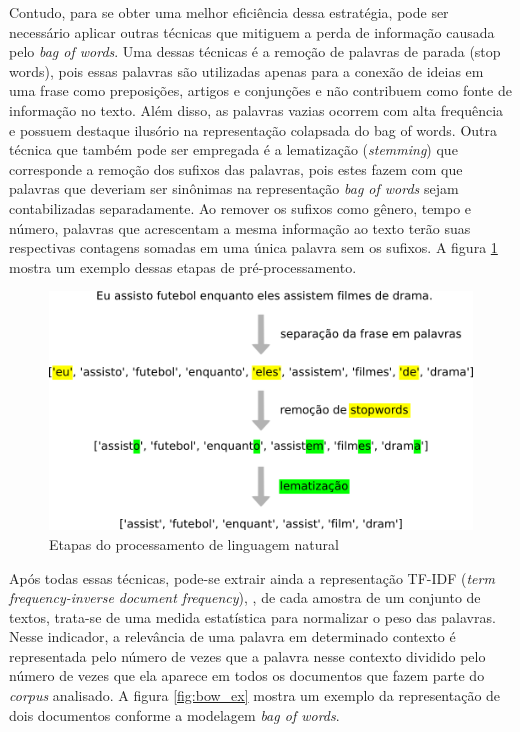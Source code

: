 Contudo, para se obter uma melhor eficiência dessa estratégia, pode ser necessário aplicar outras técnicas que mitiguem a perda de informação causada pelo \textit{bag of words}. Uma dessas técnicas é a remoção de palavras de parada (stop words), pois essas palavras são utilizadas apenas para a conexão de ideias em uma frase como preposições, artigos e conjunções e não contribuem como fonte de informação no texto. Além disso, as palavras vazias ocorrem com alta frequência e possuem destaque ilusório na representação colapsada do bag of words. Outra técnica que também pode ser empregada é a lematização (\textit{stemming}) que corresponde a remoção dos sufixos das palavras, pois estes fazem com que palavras que deveriam ser sinônimas na representação \textit{bag of words} sejam contabilizadas separadamente. Ao remover os sufixos como gênero, tempo e número, palavras que acrescentam a mesma informação ao texto terão suas respectivas contagens somadas em uma única palavra sem os sufixos. A figura \ref{fig:nl_ex} mostra um exemplo dessas etapas de pré-processamento.

\begin{figure}[!ht]
	\centering
	\includegraphics[width=1\textwidth]{figures/nltp_example.png}
	\caption{Etapas do processamento de linguagem natural}
	\label{fig:nl_ex}
\end{figure}

Após todas essas técnicas, pode-se extrair ainda a representação TF-IDF (\textit{term frequency-inverse document frequency}), \cite{InformationRetrievalBookChapter6}, de cada amostra de um conjunto de textos, trata-se de uma medida estatística para normalizar o peso das palavras. Nesse indicador, a relevância de uma palavra em determinado contexto é representada pelo número de vezes que a palavra nesse contexto dividido pelo número de vezes que ela aparece em todos os documentos que fazem parte do \textit{corpus} analisado. A figura \ref{fig:bow_ex} mostra um exemplo da representação de dois documentos conforme a modelagem \textit{bag of words}.

